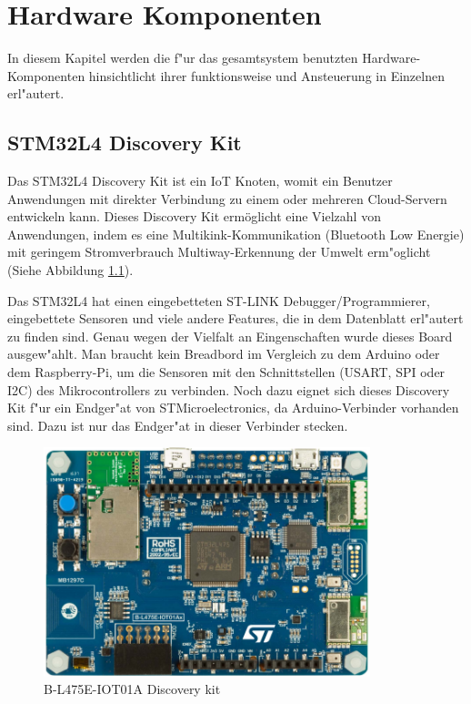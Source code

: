 \chapter{Hardware Komponenten}\label{Komponente}

In diesem Kapitel werden die f"ur das gesamtsystem benutzten Hardware-Komponenten hinsichtlicht ihrer funktionsweise und Ansteuerung in Einzelnen erl"autert. 

\section{STM32L4 Discovery Kit}\label{LoRa}

Das STM32L4 Discovery Kit ist ein IoT Knoten, womit ein Benutzer Anwendungen mit direkter Verbindung zu einem oder mehreren Cloud-Servern entwickeln kann.
Dieses Discovery Kit erm\"oglicht eine Vielzahl von Anwendungen, indem es eine Multikink-Kommunikation (Bluetooth Low Energie) mit geringem Stromverbrauch  Multiway-Erkennung der Umwelt erm"oglicht (Siehe Abbildung \ref{Node}).

Das STM32L4 hat einen eingebetteten ST-LINK Debugger/Programmierer, eingebettete Sensoren und viele andere Features, die in dem Datenblatt \cite{B-L475E-IOT01A} erl"autert zu finden sind. Genau wegen der Vielfalt an Eingenschaften wurde dieses Board ausgew"ahlt. Man braucht kein Breadbord im Vergleich zu dem Arduino oder dem Raspberry-Pi, um die Sensoren mit den Schnittstellen (USART, SPI oder I2C) des Mikrocontrollers zu verbinden. Noch dazu eignet sich dieses Discovery Kit f"ur ein Endger"at von STMicroelectronics, da Arduino-Verbinder vorhanden sind. Dazu ist nur das Endger"at in dieser Verbinder stecken. 

\begin{figure}[h]
	\centering
	\includegraphics[width=9.5cm]{source/images/Board}
	\caption{B-L475E-IOT01A Discovery kit \cite{B-L475E-IOT01A}}\label{Node}
\end{figure}

